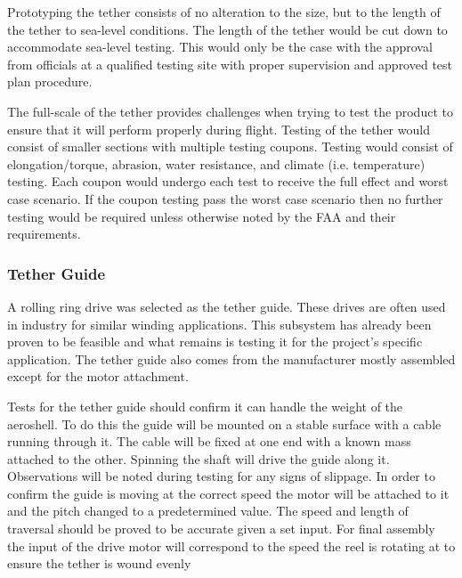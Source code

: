 \indent\indent Prototyping the tether consists of no alteration to the size, but to the length of the tether to sea-level conditions. The length of the tether would be cut down to accommodate sea-level testing. This would only be the case with the approval from officials at a qualified testing site with proper supervision and approved test plan procedure.

\indent\indent The full-scale of the tether provides challenges when trying to test the product to ensure that it will perform properly during flight. Testing of the tether would consist of smaller sections with multiple testing coupons. Testing would consist of elongation/torque, abrasion, water resistance, and climate (i.e. temperature) testing. Each coupon would undergo each test to receive the full effect and worst case scenario. If the coupon testing pass the worst case scenario then no further testing would be required unless otherwise noted by the FAA and their requirements.


\subsubsection{Tether Guide}

\indent\indent A rolling ring drive was selected as the tether guide. These drives are often used in industry for similar winding applications. This subsystem has already been proven to be feasible and what remains is testing it for the project’s specific application. The tether guide also comes from the manufacturer mostly assembled except for the motor attachment.

\indent\indent Tests for the tether guide should confirm it can handle the weight of the aeroshell. To do this the guide will be mounted on a stable surface with a cable running through it. The cable will be fixed at one end with a known mass attached to the other. Spinning the shaft will drive the guide along it. Observations will be noted during testing for any signs of slippage. In order to confirm the guide is moving at the correct speed the motor will be attached to it and the pitch changed to a predetermined value. The speed and length of traversal should be proved to be accurate given a set input. For final assembly the input of the drive motor will correspond to the speed the reel is rotating at to ensure the tether is wound evenly



